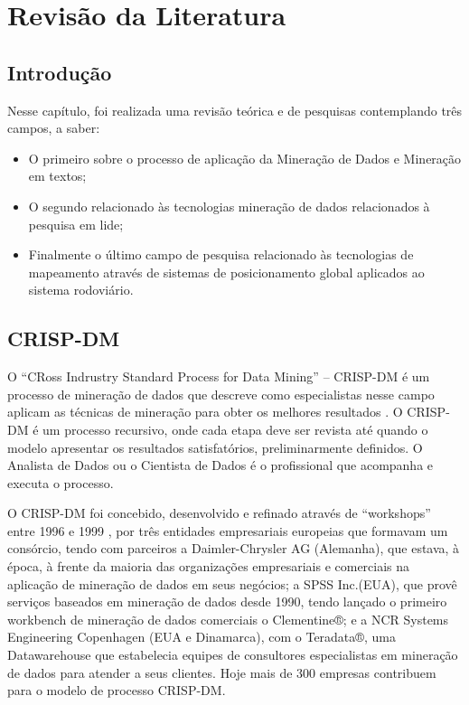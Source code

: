 \chapter{Revisão da Literatura}\label{arte}


\section{Introdução}\label{arte:intro}

Nesse capítulo, foi realizada uma revisão teórica e de pesquisas contemplando três campos, a saber: 
  \begin{itemize}
    \item O primeiro sobre o processo de aplicação da Mineração de Dados e Mineração em textos;
    \item O segundo relacionado às tecnologias mineração de dados relacionados à pesquisa em lide;
    \item Finalmente o último campo de pesquisa relacionado às tecnologias de mapeamento através de sistemas de posicionamento global 
    aplicados ao sistema rodoviário.
  \end{itemize}


  
\section{CRISP-DM}

O ``CRoss Indrustry Standard Process for Data Mining'' -- CRISP-DM é um processo de mineração de dados que descreve como especialistas 
nesse campo aplicam as técnicas de mineração para obter os melhores resultados \cite{Crisp2000}.
O CRISP-DM é um processo recursivo, onde cada etapa deve ser revista até quando o modelo apresentar os resultados satisfatórios, preliminarmente definidos.
O Analista de Dados ou o Cientista de Dados é o profissional que acompanha e executa o processo.

O CRISP-DM foi concebido, desenvolvido e refinado através de ``workshops'' entre 1996 e 1999 \cite{Crisp2000}, por três entidades empresariais europeias que 
formavam um consórcio, tendo com parceiros a Daimler-Chrysler AG (Alemanha), que estava, à época, à frente da maioria das organizações empresariais e comerciais 
na aplicação de mineração de dados em seus negócios; 
a SPSS Inc.(EUA), que provê serviços baseados em mineração de dados desde 1990, tendo lançado o primeiro workbench de mineração 
de dados comerciais o Clementine®; 
e a NCR Systems Engineering Copenhagen (EUA e Dinamarca), com o Teradata®, uma Datawarehouse que estabelecia equipes de consultores especialistas em mineração 
de dados para atender a seus clientes. Hoje mais de 300 empresas contribuem para o modelo de processo CRISP-DM.

